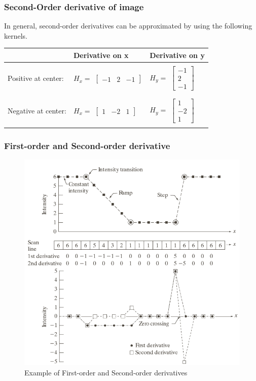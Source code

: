 \documentclass[english,11pt,table,handout]{beamer}
\begin{document}
\frame
{
	\frametitle{Second-Order derivative of image}
	In general, second-order derivatives can be approximated by using the following kernels.
	\newline
	
	\centering
	\small
	\begin{tabular}{|l|l|l|}
		\hline
		&Derivative on x & Derivative on y \\
		\hline
		& & \\
		
		Positive at center: & 
		$H_{x} = $ $\left[ \begin{array}{rrr} -1 & 2 & -1 \end{array}\right] $ & 
		$H_{y} = $ $\left[ \begin{array}{r} -1 \\ 2 \\ -1 \end{array}\right]$\\
		
		& & \\
		\hline 
		& & \\
		
		Negative at center: & 		
		$H_{x} = $ $\left[ \begin{array}{rrr} 1 & -2 & 1 \end{array}\right] $ &
		$H_{y} = $ $\left[ \begin{array}{r} 1 \\ -2 \\ 1 \end{array}\right]$\\
		& & \\
		
		\hline 
	\end{tabular}
}

\frame
{
	\frametitle{First-order and Second-order derivative}
	\begin{figure}[!h]
		\includegraphics[scale=0.6]{derivatives.png}
		\caption{Example of First-order and Second-order derivatives }
	\end{figure}
}
\end{document}
